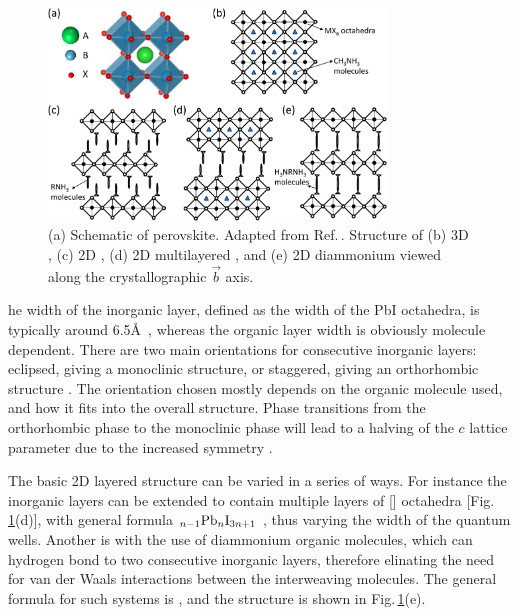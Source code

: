 \begin{figure}[ht] 
\centering    
\includegraphics[width=0.8\textwidth]{Fig3}
\caption{(a) Schematic of  perovskite. Adapted from Ref.\,\cite{Perovstruc}. Structure of (b) 3D , (c) 2D , (d) 2D multilayered , and (e) 2D diammonium  viewed along the crystallographic $\vec{b}$ axis.}
\label{2Fig3}
\end{figure}

he width of the inorganic layer, defined as the width of the PbI octahedra, is typically around 6.5\AA~\cite{Ishihara1989}, whereas the organic layer width is obviously molecule dependent. There are two main orientations for consecutive inorganic layers: eclipsed, giving a monoclinic structure, or staggered, giving an orthorhombic structure \cite{Billing2006}. The orientation chosen mostly depends on the organic molecule used, and how it fits into the overall structure. Phase transitions from the orthorhombic phase to the monoclinic phase will lead to a halving of the $c$ lattice parameter due to the increased symmetry \cite{Billing2008}.

The basic 2D layered structure can be varied in a series of ways. For instance the inorganic layers can be extended to contain multiple layers of [] octahedra [Fig.\,\ref{2Fig3}(d)], with general formula $_{n-1}\textnormal{Pb}_n\textnormal{I}_{3n+1}$ \cite{Calabrese1991}, thus varying the width of the quantum wells. Another is with the use of diammonium organic molecules, which can hydrogen bond to two consecutive inorganic layers, therefore elinating the need for van der Waals interactions between the interweaving molecules. The general formula for such systems is , and the structure is shown in Fig.\,\ref{2Fig3}(e).

